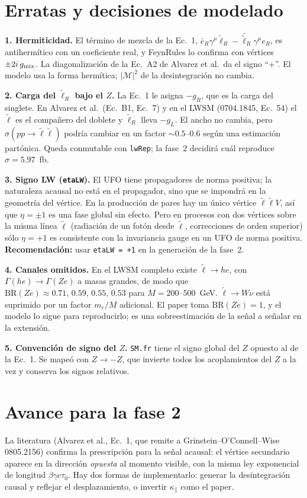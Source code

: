 \documentclass[11pt,a4paper]{article}
\newcommand{\lt}{\tilde{\ell}}
\newcommand{\obs}[1]{\par\smallskip\noindent\colorbox{orange!12}{\parbox{\dimexpr\linewidth-2\fboxsep}{\small #1}}\par\smallskip}
\begin{document}
\section{Erratas y decisiones de modelado}
\obs{\textbf{1. Hermiticidad.} El término de mezcla de la Ec.~1, $\bar e_R\gamma^\mu\lt_R-\bar\lt_R\gamma^\mu e_R$, es antihermítico con un coeficiente real, y FeynRules lo confirma con vértices $\pm2i\,g_{\rm mix}$. La diagonalización de la Ec.~A2 de Alvarez et al.\ da el signo ``$+$''. El modelo usa la forma hermítica; $|\mathcal{M}|^2$ de la desintegración no cambia.}
\obs{\textbf{2. Carga del $\lt_R$ bajo el $Z$.} La Ec.~1 le asigna $-g_R$, que es la carga del singlete. En Alvarez et al.\ (Ec.~B1, Ec.~7) y en el LWSM (0704.1845, Ec.~54) el $\lt$ es el compañero del doblete y $\lt_R$ lleva $-g_L$. El ancho no cambia, pero $\sigma(pp\to\lt\lt)$ podría cambiar en un factor $\sim0.5$--$0.6$ según una estimación partónica. Queda conmutable con \texttt{lwRep}; la fase~2 decidirá cuál reproduce $\sigma=5.97$~fb.}
\obs{\textbf{3. Signo LW (\texttt{etaLW}).} El UFO tiene propagadores de norma positiva; la naturaleza acausal no está en el propagador, sino que se impondrá en la geometría del vértice. En la producción de pares hay un único vértice $\lt\lt V$, así que $\eta=\pm1$ es una fase global sin efecto. Pero en procesos con dos vértices sobre la misma línea $\lt$ (radiación de un fotón desde $\lt$, correcciones de orden superior) sólo $\eta=+1$ es consistente con la invariancia gauge en un UFO de norma positiva. \textbf{Recomendación:} usar \texttt{etaLW = +1} en la generación de la fase~2.}
\obs{\textbf{4. Canales omitidos.} En el LWSM completo existe $\lt\to he$, con $\Gamma(he)\to\Gamma(Ze)$ a masas grandes, de modo que $\mathrm{BR}(Ze)\approx0.71,\,0.59,\,0.55,\,0.53$ para $M=200$--$500$~GeV. $\lt\to W\nu$ está suprimido por un factor $m_e/M$ adicional. El paper toma $\mathrm{BR}(Ze)=1$, y el modelo lo sigue para reproducirlo; es una sobreestimación de la señal a señalar en la extensión.}
\obs{\textbf{5. Convención de signo del $Z$.} \texttt{SM.fr} tiene el signo global del $Z$ opuesto al de la Ec.~1. Se mapeó con $Z\to-Z$, que invierte todos los acoplamientos del $Z$ a la vez y conserva los signos relativos.}

\section{Avance para la fase 2}
La literatura (Alvarez et al., Ec.~1, que remite a Grinstein--O'Connell--Wise 0805.2156) confirma la prescripción para la señal acausal: el vértice secundario aparece en la dirección \emph{opuesta} al momento visible, con la misma ley exponencial de longitud $\beta\gamma c\tau_0$. Hay dos formas de implementarlo: generar la desintegración causal y reflejar el desplazamiento, o invertir $\kappa_\parallel$ como el paper.
\end{document}
